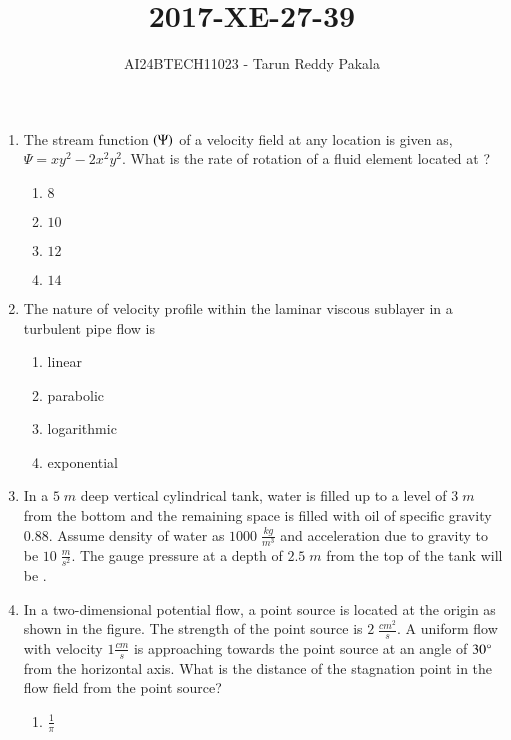 \documentclass[journal,12pt,onecolumn]{IEEEtran}
\title{2017-XE-27-39}
\author{AI24BTECH11023 - Tarun Reddy Pakala}
\theoremstyle{remark}
\begin{document}


\maketitle
\bigskip
\renewcommand{\thefigure}{\theenumi}
\renewcommand{\thetable}{\theenumi}
\begin{enumerate}[start=27]
\item The stream function $\left(\Psi\right)$ of a velocity field at any location  is given as, $\Psi=xy^2-2x^2y^2$. What is the rate of rotation of a fluid element located at ?
\begin{enumerate}
    \item $8$
    \item $10$
    \item $12$
    \item $14$
\end{enumerate}
\item The nature of velocity profile within the laminar viscous sublayer in a turbulent pipe flow is
\begin{enumerate}
    \item linear 
    \item parabolic
    \item logarithmic
    \item exponential
\end{enumerate}
\item In a $5\;m$ deep vertical cylindrical tank, water is filled up to a level of $3\;m$ from the bottom and the remaining space is filled with oil of specific gravity $0.88$. Assume density of water as $1000\;\frac{kg}{m^3}$ and acceleration due to gravity to be $10\;\frac{m}{s^2}$. The gauge pressure  at a depth of $2.5\;m$ from the top of the tank will be \underline{\hspace{2cm}}.
\item In a two-dimensional potential flow, a point source is located at the origin  as shown in the figure. The strength of the point source is $2\;\frac{cm^2}{s}$. A uniform flow with velocity $1\frac{cm}{s}$ is approaching towards the point source at an angle of $30\degree$ from the horizontal axis. What is the distance  of the stagnation point in the flow field from the point source?
	
	\begin{enumerate}
    \item $\frac{1}{\pi}$

\end{enumerate}
\end{enumerate}
\end{document}
